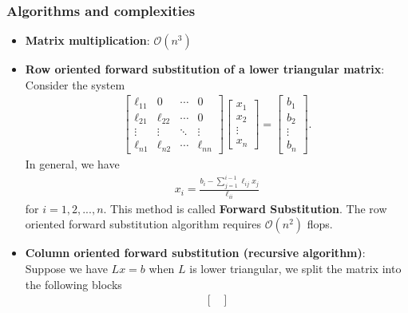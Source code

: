 \documentclass{report}
\begin{document}
    \subsubsection{Algorithms and complexities}
    \begin{itemize}
        \item \textbf{Matrix multiplication}: $\mathcal{O}(n^{3}) $
        \item \textbf{Row oriented forward substitution of a lower triangular matrix}:
            Consider the system
            \begin{align*}
                \begin{bmatrix}
                    \ell_{11} & 0 & \cdots & 0 \\
                    \ell_{21} & \ell_{22} & \cdots & 0 \\
                    \vdots & \vdots & \ddots & \vdots \\
                    \ell_{n1} & \ell_{n2} & \cdots & \ell_{nn}
                    \end{bmatrix} \begin{bmatrix}
                    x_{1} \\ x_{2} \\ \vdots \\ x_{n}
                \end{bmatrix}
                =
                \begin{bmatrix}
                    b_{1} \\ b_{2} \\ \vdots \\ b_{n}
                \end{bmatrix}
            .\end{align*}
            In general, we have
            \begin{align*}
                x_{i} = \frac{b_{i} - \sum_{j=1}^{i-1}\ell_{ij}x_{j}}{\ell_{ii}}
            \end{align*}
            for $i =1,2,...,n $. This method is called \textbf{Forward Substitution}.
            \bigbreak \noindent 
            The row oriented forward substitution algorithm requires $\mathcal{O}(n^{2})$ flops.
        \item \textbf{Column oriented forward substitution (recursive algorithm)}: 
            Suppose we have $Lx = b$ when $L$ is lower triangular, we split the matrix into the following blocks
            \begin{align*}
                \begin{bmatrix}

\end{bmatrix}
\end{align*}
\end{itemize}
\end{document}
